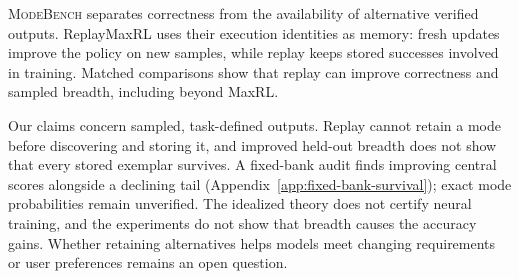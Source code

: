 \documentclass{article}
\newcommand{\1}{\mathbf 1}
\newcommand{\mb}{\textsc{ModeBench}}
\theoremstyle{remark}
\theoremstyle{definition}
\theoremstyle{plain}
\begin{document}
\mb{} separates correctness from the availability of alternative verified
outputs. ReplayMaxRL uses their execution identities as memory: fresh updates
improve the policy on new samples, while replay keeps stored successes involved
in training. Matched comparisons show that replay can improve correctness and
sampled breadth, including beyond MaxRL.

Our claims concern sampled, task-defined outputs. Replay cannot retain a mode
before discovering and storing it, and improved held-out breadth does not
show that every stored exemplar survives. A fixed-bank audit finds improving
central scores alongside a declining tail
(Appendix~\ref{app:fixed-bank-survival}); exact mode probabilities remain
unverified. The idealized theory does not certify neural training, and the
experiments do not show that breadth causes the accuracy gains. Whether retaining alternatives helps models meet changing requirements or user preferences remains an open question.
\label{sec:main-end}

\clearpage
{}\label{sec:references}



\long{}
\end{document}

